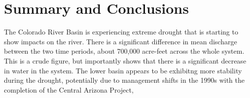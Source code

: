 \documentclass[
  12pt,
]{article}
\begin{document}
\newpage

\hypertarget{summary-and-conclusions}{%
\section{Summary and Conclusions}\label{summary-and-conclusions}}

The Colorado River Basin is experiencing extreme drought that is
starting to show impacts on the river. There is a significant difference
in mean discharge between the two time periods, about 700,000 acre-feet
across the whole system. This is a crude figure, but importantly shows
that there is a significant decrease in water in the system. The lower
basin appears to be exhibitng more stability during the drought,
potentially due to management shifts in the 1990s with the completion of
the Central Arizona Project,
\end{document}

